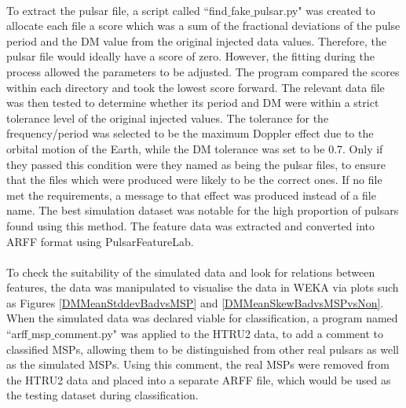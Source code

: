 \documentclass[12pt]{article}
\begin{document}
\paragraph{}
To extract the pulsar file, a script called ``find$\_$fake$\_$pulsar.py" was created to allocate each file a score which was a sum of the fractional deviations of the pulse period and the DM value from the original injected data values. Therefore, the pulsar file would ideally have a score of zero. However, the fitting during the process allowed the parameters to be adjusted. The program compared the scores within each directory and took the lowest score forward. The relevant data file was then tested to determine whether its period and DM were within a strict tolerance level of the original injected values. The tolerance for the frequency/period was selected to be the maximum Doppler effect due to the orbital motion of the Earth, while the DM tolerance was set to be 0.7. Only if they passed this condition were they named as being the pulsar files, to ensure that the files which were produced were likely to be the correct ones. If no file met the requirements, a message to that effect was produced instead of a file name. The best simulation dataset was notable for the high proportion of pulsars found using this method. The feature data was extracted and converted into ARFF format using PulsarFeatureLab.
\paragraph{}
To check the suitability of the simulated data and look for relations between features, the data was manipulated to visualise the data in WEKA via plots such as Figures \ref{DMMeanStddevBadvsMSP} and \ref{DMMeanSkewBadvsMSPvsNon}. When the simulated data was declared viable for classification, a program named ``arff$\_$msp$\_$comment.py" was applied to the HTRU2 data, to add a comment to classified MSPs, allowing them to be distinguished from other real pulsars as well as the simulated MSPs. Using this comment, the real MSPs were removed from the HTRU2 data and placed into a separate ARFF file, which would be used as the testing dataset during classification.
\end{document}
